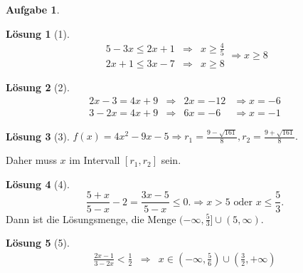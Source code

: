 \documentclass{article}
\theoremstyle{definition}
\newtheorem{ub}{Aufgabe}
\newtheorem*{lo*}{Lösung}
\begin{document}
\begin{ub}
	\begin{lo*}[1]
		\[ 
		\begin{array}{ccc}
			5 - 3x  \leq 2x+1 & \Rightarrow & x \geq \frac{4}{5} \\
			2x+1 \leq 3x-7 & \Rightarrow & x \geq 8
		\end{array} \Rightarrow x \geq 8
		 \]
	\end{lo*}
	\begin{lo*}[2]
	\[ 
	\begin{array}{cccc}
		2x-3 = 4x+9 & \Rightarrow & 2x = -12 & \Rightarrow x = -6 \\
		3 - 2x = 4x+9 & \Rightarrow & 6x = -6 & \Rightarrow x = -1
	\end{array}
	 \]
	\end{lo*}
	\begin{lo*}[3]
		\( 
		f(x) = 4x^2 - 9x - 5 \Rightarrow r_1 = \frac{9-\sqrt{161}}{8}, r_2 = \frac{9 + \sqrt{161}}{8}.
		 \)
		\begin{center}
		\end{center}
	Daher muss $ x $ im Intervall $ [r_1 , r_2] $ sein.
	\end{lo*}
	\begin{lo*}[4]
		\[
		\frac{5+x}{5-x} - 2 = \frac{3x-5}{5-x} \leq 0. \Rightarrow x > 5 \,\, \text{oder} \,\,
		x \leq \frac{5}{3}.  
		 \]
		 Dann ist die Lösungsmenge, die Menge 
		 $ (-\infty , \frac{5}{3}] \cup (5,\infty) $.
	\end{lo*}
	\begin{lo*}[5]
		\[ 
		\begin{array}{ccl}
			\frac{2x-1}{3-2x} < \frac{1}{2} & \Rightarrow & x \in (-\infty , \frac{5}{6}) \cup (\frac{3}{2} , +\infty) \\

\end{array}\]
\end{lo*}
\end{ub}
\end{document}
